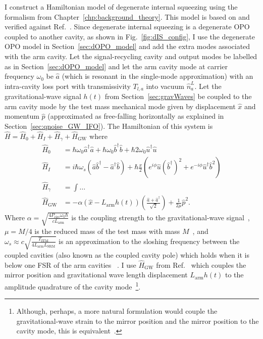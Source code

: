 I construct a Hamiltonian model of degenerate internal squeezing using the formalism from Chapter~\ref{chp:background_theory}. This model is based on and verified against Ref.~\cite{Korobko2019}. %
Since degenerate internal squeezing is a degenerate OPO coupled to another cavity, as shown in Fig.~\ref{fig:dIS_config}, I use the degenerate OPO model in Section~\ref{sec:dOPO_model} and add the extra modes associated with the arm cavity. Let the signal-recycling cavity and output modes be labelled as in Section~\ref{sec:dOPO_model} and let the arm cavity mode at carrier frequency $\omega_0$ be $\hat a$ (which is resonant in the single-mode approximation) with an intra-cavity loss port with transmissivity $T_{l,a}$ into vacuum $\hat n^L_a$. Let the gravitational-wave signal $h(t)$ from Section~\ref{sec:gravWaves} be coupled to the arm cavity mode by the test mass mechanical mode given by displacement $\hat x$ and momentum $\hat p$ (approximated as free-falling horizontally as explained in Section~\ref{sec:qnoise_GW_IFO}). 
The Hamiltonian of this system is $\hat H = \hat H_0 + \hat H_I + \hat H_\gamma + \hat H_\text{GW}$ where~\cite{}
\begin{align}
\hat H_0 &= \hbar \omega_0 \hat a^\dag \hat a + \hbar \omega_0 \hat b^\dag \hat b + \hbar 2\omega_0 \hat u^\dag \hat u\\
\hat H_I &= i\hbar\omega_s(\hat a\hat b^\dag-\hat a^\dag\hat b) +\hbar \frac{x}{2} (e^{i\phi} \hat u (\hat b^\dag)^2 + e^{-i\phi} \hat u^\dag \hat b^2)\\
\hat H_\gamma &= \int \ldots \\
\hat H_\text{GW} &= -\alpha (\hat{x}-L_\mathrm{arm}h(t))(\frac{\hat{a}+\hat{a}^\dag}{\sqrt{2}})+\frac{1}{2\mu}\hat{p}^2.
\end{align}
Where $\alpha=\sqrt{\frac{4 P_\text{circ} \omega_0 \hbar}{c  L_\text{arm}}}$  is the coupling strength to the gravitational-wave signal~\cite{}, $\mu=M/4$ is the reduced mass of the test mass with mass $M$~\cite{}, and $\omega_s\approx c\sqrt{\frac{T_\text{ITM}}{4 L_\text{arm} L_\text{SRM}}}$ is an approximation to the sloshing frequency between the coupled cavities (also known as the coupled cavity pole) which holds when it is below one FSR of the arm cavities ~\cite{}. I use $\hat H_\text{GW}$ from Ref.~\cite{Li2020,original source?} which couples the mirror position and gravitational wave length displacement $L_\text{arm} h(t)$ to the amplitude quadrature of the cavity mode~\footnote{Although, perhaps, a more natural formulation would couple the gravitational-wave strain to the mirror position and the mirror position to the cavity mode, this is equivalent~\cite{}.}. 

